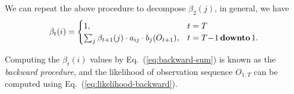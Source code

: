 We can repeat the above procedure to decompose $\beta_2(j)$, in general, we have
\begin{equation}
\label{eq:backward-sum}
\beta_t(i) = \begin{cases}
              1, & t=T \\
              \sum_{j} \beta_{t+1}(j) \cdot a_{ij} \cdot b_j(O_{t+1}), & t=T\!-\!1 \,\textbf{downto}\, 1.
             \end{cases}
\end{equation}

Computing the $\beta_t(i)$ values by Eq.~(\ref{eq:backward-sum}) is known as the \emph{backward procedure}, 
and the likelihood of observation sequence $O_{1:T}$ can be computed using Eq.~(\ref{eq:likelihood-backward}).

